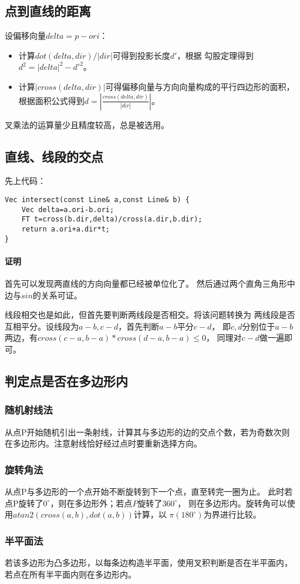 \subsection{点到直线的距离}
设偏移向量$delta=p-ori$：
\begin{itemize}
	\item 计算$dot(delta,dir)/|dir|$可得到投影长度$d'$，根据
	      勾股定理得到$d^2=|delta|^2-d'^2$。
	\item 计算$|cross(delta,dir)|$可得偏移向量与方向向量构成的平行四边形的面积，
	      根据面积公式得到$d=|\frac{cross(delta,dir)}{|dir|}|$。
\end{itemize}
叉乘法的运算量少且精度较高，总是被选用。
\subsection{直线、线段的交点}
先上代码：
\begin{lstlisting}
Vec intersect(const Line& a,const Line& b) {
    Vec delta=a.ori-b.ori;
    FT t=cross(b.dir,delta)/cross(a.dir,b.dir);
    return a.ori+a.dir*t;
}
\end{lstlisting}
\paragraph{证明} 首先可以发现两直线的方向向量都已经被单位化了。
然后通过两个直角三角形中边与$sin$的关系可证。

线段相交也是如此，但首先要判断两线段是否相交。将该问题转换为
两线段是否互相平分。设线段为$a-b,c-d$，首先判断$a-b$平分$c-d$，
即$c,d$分别位于$a-b$两边，有$cross(c-a,b-a)*cross(d-a,b-a)\leq 0$，
同理对$c-d$做一遍即可。
\subsection{判定点是否在多边形内}
\subsubsection{随机射线法}
从点P开始随机引出一条射线，计算其与多边形的边的交点个数，若为奇数次则
在多边形内。注意射线恰好经过点时要重新选择方向。
\subsubsection{旋转角法}
从点P与多边形的一个点开始不断旋转到下一个点，直至转完一圈为止。
此时若点P旋转了$0^\circ$，则在多边形外；若点$P$旋转了$360^\circ$，
则在多边形内。旋转角可以使用$atan2(cross(a,b),dot(a,b))$计算，以
$\pi(180^\circ)$为界进行比较。
\subsubsection{半平面法}
若该多边形为凸多边形，以每条边构造半平面，使用叉积判断是否在半平面内，
若点在所有半平面内则在多边形内。
